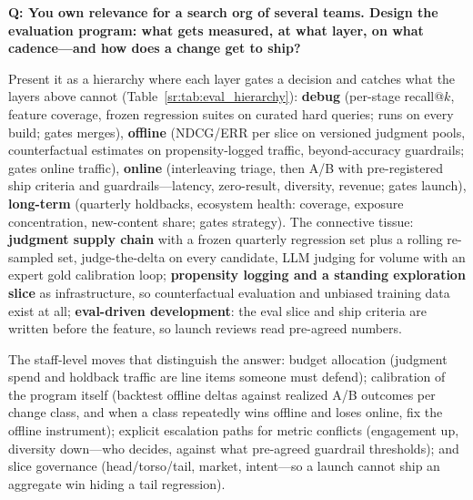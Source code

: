 \begin{interviewq}

\end{interviewq}

\begin{interviewq}
\textbf{Q: You own relevance for a search org of several teams. Design the evaluation program: what gets measured, at what layer, on what cadence---and how does a change get to ship?}

 \quad {} \quad \badgefreq{\freqlow}

\stronganswer

Present it as a hierarchy where each layer gates a decision and catches what the layers above cannot (Table~\ref{sr:tab:eval_hierarchy}): \textbf{debug} (per-stage recall@$k$, feature coverage, frozen regression suites on curated hard queries; runs on every build; gates merges), \textbf{offline} (NDCG/ERR per slice on versioned judgment pools, counterfactual estimates on propensity-logged traffic, beyond-accuracy guardrails; gates online traffic), \textbf{online} (interleaving triage, then A/B with pre-registered ship criteria and guardrails---latency, zero-result, diversity, revenue; gates launch), \textbf{long-term} (quarterly holdbacks, ecosystem health: coverage, exposure concentration, new-content share; gates strategy). The connective tissue: \textbf{judgment supply chain} with a frozen quarterly regression set plus a rolling re-sampled set, judge-the-delta on every candidate, LLM judging for volume with an expert gold calibration loop; \textbf{propensity logging and a standing exploration slice} as infrastructure, so counterfactual evaluation and unbiased training data exist at all; \textbf{eval-driven development}: the eval slice and ship criteria are written before the feature, so launch reviews read pre-agreed numbers.

The staff-level moves that distinguish the answer: budget allocation (judgment spend and holdback traffic are line items someone must defend); calibration of the program itself (backtest offline deltas against realized A/B outcomes per change class, and when a class repeatedly wins offline and loses online, fix the offline instrument); explicit escalation paths for metric conflicts (engagement up, diversity down---who decides, against what pre-agreed guardrail thresholds); and slice governance (head/torso/tail, market, intent---so a launch cannot ship an aggregate win hiding a tail regression).


\end{interviewq}
